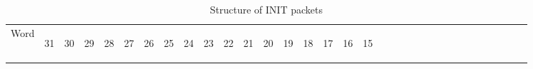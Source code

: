 \documentclass[11pt]{article}
\begin{document}
\begin{table}[h!]
    \centering
    \caption{Structure of INIT packets}
    \label{tab:InitDef}
    \begin{tabular}{|p{1cm}|m{0.04cm}|m{0.04cm}|m{0.04cm}|m{0.04cm}|m{0.04cm}|m{0.04cm}|m{0.04cm}|m{0.04cm}|m{0.04cm}|
        m{0.04cm}|m{0.04cm}|m{0.04cm}|m{0.04cm}|m{0.04cm}|m{0.04cm}|m{0.04cm}|m{0.04cm}|m{0.04cm}|m{0.04cm}|m{0.04cm}|
        m{0.04cm}|m{0.04cm}|m{0.04cm}|m{0.04cm}|m{0.04cm}|m{0.04cm}|m{0.04cm}|m{0.04cm}|m{0.04cm}|m{0.04cm}|m{0.04cm}|m{0.04cm}|}
        \hline
        Word & 
        \begin{sideways}31\end{sideways} &
        \begin{sideways}30\end{sideways} & 
        \begin{sideways}29\end{sideways} &
        \begin{sideways}28\end{sideways} &
        \begin{sideways}27\end{sideways} &
        \begin{sideways}26\end{sideways} &
        \begin{sideways}25\end{sideways} &
        \begin{sideways}24\end{sideways} &
        \begin{sideways}23\end{sideways} &
        \begin{sideways}22\end{sideways} &
        \begin{sideways}21\end{sideways} &
        \begin{sideways}20\end{sideways} &
        \begin{sideways}19\end{sideways} &
        \begin{sideways}18\end{sideways} &
        \begin{sideways}17\end{sideways} &
        \begin{sideways}16\end{sideways} &
        \begin{sideways}15\end{sideways} &

\end{tabular}
\end{table}
\end{document}

